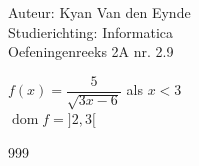 \documentclass[a4paper]{article}
\begin{document}
  
\noindent \large Auteur: Kyan Van den Eynde \\
\noindent \large Studierichting: Informatica\\
\noindent \large Oefeningenreeks 2A nr. 2.9\\

\medskip

\normalsize

$f(x) = \dfrac{5}{\sqrt{3x-6}}$ als $x < 3$\\

$\operatorname{dom}f = ]2,3[$\\

\begin{thebibliography}{999}
\end{thebibliography}
\end{document}
